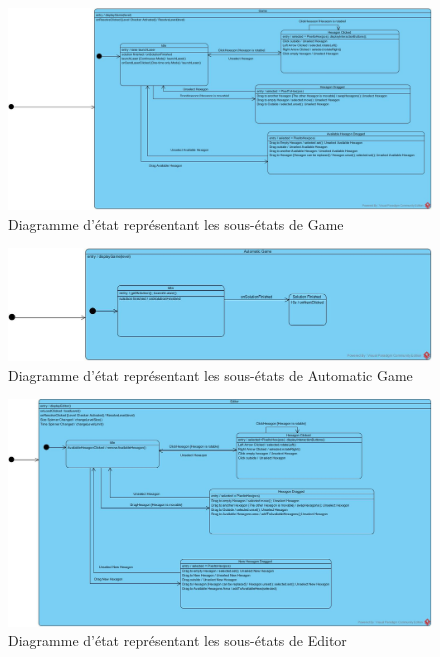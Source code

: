 \documentclass[]{article}
\begin{document}
\begin{figure}[H]
\begin{center}
  \includegraphics[width=\textwidth]{State2.jpg}
  \caption{Diagramme d'état représentant les sous-états de Game}\label{fig:auto}
\end{center}
\end{figure}

\begin{figure}[H]
\begin{center}
  \includegraphics[width=\textwidth]{State3.jpg}
  \caption{Diagramme d'état représentant les sous-états de Automatic Game}\label{fig:auto}
\end{center}
\end{figure}

\begin{figure}[H]
\begin{center}
  \includegraphics[width=\textwidth]{State4.jpg}
  \caption{Diagramme d'état représentant les sous-états de Editor}\label{fig:auto}
\end{center}
\end{figure}
\end{document}
